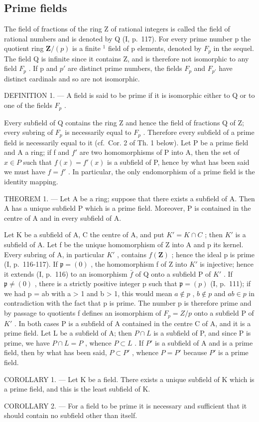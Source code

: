 \subsection{Prime fields}

The field of fractions of the ring Z of rational integers is called the field of rational numbers and is denoted by Q (I, p.~117). For every prime number p the quotient ring \(\mathbf{Z}/(p)\) is a finite \(^{1}\) field of p elements, denoted by \(F_{p}\) in the sequel. The field Q is infinite since it contains Z, and is therefore not isomorphic to any field \(F_{p}\) . If p and \(p'\) are distinct prime numbers, the fields \(F_{p}\) and \(F_{p'}\) have distinct cardinals and so are not isomorphic.

DEFINITION 1. --- A field is said to be prime if it is isomorphic either to Q or to one of the fields \(F_{p}\) .

Every subfield of Q contains the ring Z and hence the field of fractions Q of Z; every subring of \(F_{p}\) is necessarily equal to \(F_{p}\) . Therefore every subfield of a prime field is necessarily equal to it (cf.~Cor. 2 of Th. 1 below). Let P be a prime field and A a ring; if f and \(f'\) are two homomorphisms of P into A, then the set of \(x \in P\) such that \(f(x) = f'(x)\) is a subfield of P, hence by what has been said we must have \(f = f'\) . In particular, the only endomorphism of a prime field is the identity mapping.

THEOREM 1. --- Let A be a ring; suppose that there exists a subfield of A. Then A has a unique subfield P which is a prime field. Moreover, P is contained in the centre of A and in every subfield of A.

Let K be a subfield of A, C the centre of A, and put \(K' = K \cap C\) ; then \(K'\) is a subfield of A. Let f be the unique homomorphism of Z into A and p its kernel. Every subring of A, in particular \(K'\) , contains \(f(\mathbf{Z})\) ; hence the ideal p is prime (I, p.~116-117). If \(\mathfrak{p} = (0)\) , the homomorphism f of Z into \(K'\) is injective; hence it extends (I, p.~116) to an isomorphism \(\bar{f}\) of Q onto a subfield P of \(K'\) . If \(\mathfrak{p} \neq (0)\) , there is a strictly positive integer p such that \(\mathfrak{p} = (p)\) (I, p.~111); if we had p = ab with a \textgreater{} 1 and b \textgreater{} 1, this would mean \(a \notin p\) , \(b \notin p\) and \(ab \in p\) in contradiction with the fact that p is prime. The number p is therefore prime and by passage to quotients f defines an isomorphism of \(F_p = Z/p\) onto a subfield P of \(K'\) . In both cases P is a subfield of A contained in the centre C of A, and it is a prime field. Let L be a subfield of A; then \(P \cap L\) is a subfield of P, and since P is prime, we have \(P \cap L = P\) , whence \(P \subset L\) . If \(P'\) is a subfield of A and is a prime field, then by what has been said, \(P \subset P'\) , whence \(P = P'\) because \(P'\) is a prime field.

COROLLARY 1. --- Let K be a field. There exists a unique subfield of K which is a prime field, and this is the least subfield of K.

COROLLARY 2. --- For a field to be prime it is necessary and sufficient that it should contain no subfield other than itself.


